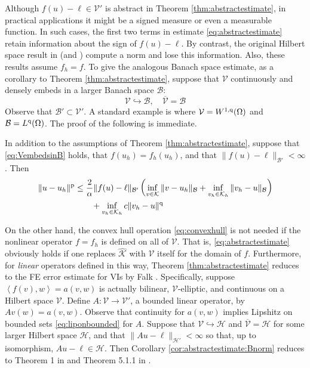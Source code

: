 \documentclass[hidelinks,onefignum,onetabnum,final]{siamart220329}  %
\newcommand{\cB}{\mathcal{B}}
\newcommand{\cH}{\mathcal{H}}
\newcommand{\cK}{\mathcal{K}}
\newcommand{\cV}{\mathcal{V}}
\newcommand{\hcK}{\widehat{\cK}}
\newcommand{\pp}{{\text{\textnormal{p}}}}
\newcommand{\qq}{{\text{\textnormal{q}}}}
\newcommand{\ip}[2]{\left<#1,#2\right>}
\begin{document}
Although $f(u)-\ell\in \cV'$ is abstract in Theorem \ref{thm:abstractestimate}, in practical applications it might be a signed measure or even a measurable function.  In such cases, the first two terms in estimate \eqref{eq:abstractestimate} retain information about the sign of $f(u)-\ell$.  By contrast, the original Hilbert space result in \cite{Falk1974} (and \cite[section 5.1]{Ciarlet2002}) compute a norm and lose this information.  Also, these results assume $f_h=f$.  To give the analogous Banach space estimate, as a corollary to Theorem \ref{thm:abstractestimate}, suppose that $\cV$ continuously and densely embeds in a larger Banach space $\cB$:
\begin{equation}
\cV \hookrightarrow \cB, \quad \overline{\cV} = \cB \label{eq:VembedsinB}
\end{equation}
Observe that $\cB' \subset \cV'$.  A standard example is where $\cV=W^{1,\qq}(\Omega)$ and $\cB=L^\qq(\Omega)$.  The proof of the following is immediate.

\begin{corollary}  \label{cor:abstractestimate:Bnorm}  In addition to the assumptions of Theorem \ref{thm:abstractestimate}, suppose that \eqref{eq:VembedsinB} holds, that $f(u_h)=f_h(u_h)$, and that $\|f(u)-\ell\|_{\cB'} < \infty$.  Then
\begin{align}
\|u-u_h\|^\pp &\le \frac{2}{\alpha} \|f(u)-\ell\|_{\cB'} \left( \inf_{v\in\cK} \|v-u_h\|_{\cB} +   \inf_{v_h\in\cK_h} \|v_h-u\|_{\cB} \right) \label{eq:abstractestimate:Bnorm} \\
   &\qquad + \inf_{v_h\in\cK_h} c \|v_h - u\|^\qq \notag
\end{align}
\end{corollary}

On the other hand, the convex hull operation \eqref{eq:convexhull} is not needed if the nonlinear operator $f=f_h$ is defined on all of $\cV$.  That is, \eqref{eq:abstractestimate} obviously holds if one replaces $\hcK$ with $\cV$ itself for the domain of $f$.  Furthermore, for \emph{linear} operators defined in this way, Theorem \ref{thm:abstractestimate} reduces to the FE error estimate for VIs by Falk \cite{Falk1974}.  Specifically, suppose $\ip{f(v)}{w}=a(v,w)$ is actually bilinear, $\cV$-elliptic, and continuous on a Hilbert space $\cV$.  Define $A:\cV\to\cV'$, a bounded linear operator, by $Av(w) = a(v,w)$.  Observe that continuity for $a(v,w)$ implies Lipshitz on bounded sets \eqref{eq:liponbounded} for $A$.  Suppose that $\cV\hookrightarrow \cH$ and $\overline{\cV} = \cH$ for some larger Hilbert space $\cH$, and that $\|Au-\ell\|_{\cH'} < \infty$ so that, up to isomorphism, $Au-\ell \in \cH$.  Then Corollary \ref{cor:abstractestimate:Bnorm} reduces to Theorem 1 in \cite{Falk1974} and Theorem 5.1.1 in \cite{Ciarlet2002}.
\end{document}
